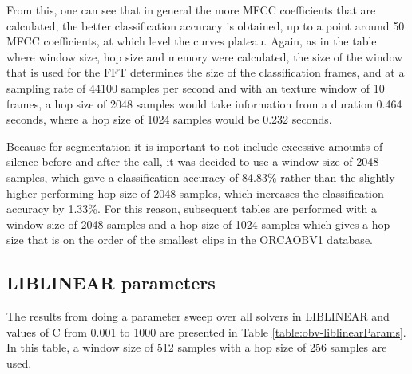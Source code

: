 From this, one can see that in general the more MFCC coefficients that
are calculated, the better classification accuracy is obtained, up to
a point around 50 MFCC coefficients, at which level the curves
plateau.  Again, as in the table where window size, hop size and
memory were calculated, the size of the window that is used for the
FFT determines the size of the classification frames, and at a
sampling rate of 44100 samples per second and with an texture window
of 10 frames, a hop size of 2048 samples would take information from a
duration 0.464 seconds, where a hop size of 1024 samples would be
0.232 seconds.

Because for segmentation it is important to not include excessive
amounts of silence before and after the call, it was decided to use a
window size of 2048 samples, which gave a classification accuracy of
84.83\% rather than the slightly higher performing hop size of 2048
samples, which increases the classification accuracy by 1.33\%.  For
this reason, subsequent tables are performed with a window size of
2048 samples and a hop size of 1024 samples which gives a hop size
that is on the order of the smallest clips in the ORCAOBV1 database.


%
%
\subsection{LIBLINEAR parameters}


The results from doing a parameter sweep over all solvers in LIBLINEAR
and values of C from 0.001 to 1000 are presented in Table
\ref{table:obv-liblinearParams}.  In this table, a window size of 512
samples with a hop size of 256 samples are used.

